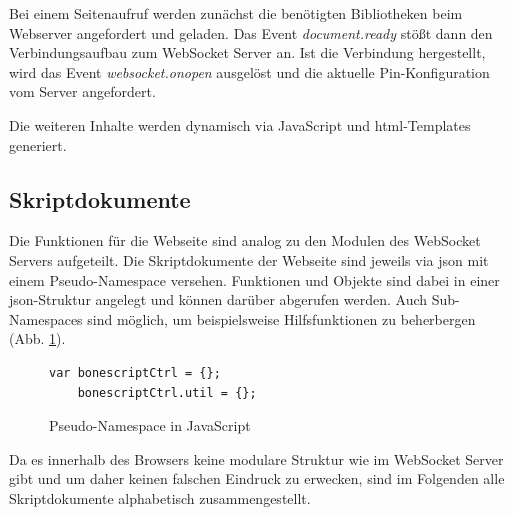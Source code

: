 Bei einem Seitenaufruf werden zunächst die benötigten Bibliotheken beim Webserver angefordert und geladen. Das Event \textit{document.ready} stößt dann den Verbindungsaufbau zum WebSocket Server an. Ist die Verbindung hergestellt, wird das Event \textit{websocket.onopen} ausgelöst und die aktuelle Pin-Konfiguration vom Server angefordert.

Die weiteren Inhalte werden dynamisch via JavaScript und \gls{html}-Templates generiert.


\subsection{Skriptdokumente}
Die Funktionen für die Webseite sind analog zu den Modulen des WebSocket Servers aufgeteilt. Die Skriptdokumente der Webseite sind jeweils via \gls{json} mit einem Pseudo-Namespace versehen. Funktionen und Objekte sind dabei in einer \gls{json}-Struktur angelegt und können darüber abgerufen werden. Auch Sub-Namespaces sind möglich, um beispielsweise Hilfsfunktionen zu beherbergen (Abb. \ref{lst:pseudeNamespaceJS}).

\begin{figure}[ht]
\begin{lstlisting}
var bonescriptCtrl = {};
    bonescriptCtrl.util = {};
\end{lstlisting}
\caption{Pseudo-Namespace in JavaScript}
\label{lst:pseudeNamespaceJS}
\end{figure}

Da es innerhalb des Browsers keine modulare Struktur wie im WebSocket Server gibt und um daher keinen falschen Eindruck zu erwecken, sind im Folgenden alle Skriptdokumente alphabetisch zusammengestellt.

